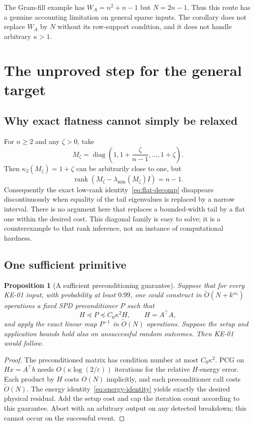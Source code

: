 \documentclass[11pt,a4paper]{article}
\newcommand{\rank}{\operatorname{rank}}
\newcommand{\diag}{\operatorname{diag}}
\newcommand{\softO}{\widetilde O}
\newcommand{\cond}{\kappa_2}
\newcommand{\eps}{\varepsilon}
\newtheorem{proposition}[theorem]{Proposition}
\theoremstyle{definition}
\theoremstyle{remark}
\begin{document}
The Gram-fill example has $W_A=n^2+n-1$ but $N=2n-1$. Thus this route has a genuine accounting limitation on general sparse inputs. The corollary does not replace $W_A$ by $N$ without its row-support condition, and it does not handle arbitrary $\kappa>1$.

\section{The unproved step for the general target}
\label{sec:missing}
\subsection{Why exact flatness cannot simply be relaxed}
For $n\ge2$ and any $\zeta>0$, take
\[
 M_\zeta=\diag\left(1,1+\frac\zeta{n-1},\ldots,1+\zeta\right).
\]
Then $\cond(M_\zeta)=1+\zeta$ can be arbitrarily close to one, but
\[
 \rank(M_\zeta-\lambda_{\min}(M_\zeta)I)=n-1.
\]
Consequently the exact low-rank identity~\eqref{eq:flat-decomp} disappears discontinuously when equality of the tail eigenvalues is replaced by a narrow interval. There is no argument here that replaces a bounded-width tail by a flat one within the desired cost. This diagonal family is easy to solve; it is a counterexample to that rank inference, not an instance of computational hardness.

\subsection{One sufficient primitive}
\begin{proposition}[A sufficient preconditioning guarantee]
\label{prop:sufficient}
Suppose that for every KE-01 input, with probability at least $0.99$, one could construct in $\softO(N+k^{\omega_0})$ operations a fixed SPD preconditioner $P$ such that
\begin{equation}
 H\preceq P\preceq C_0\kappa^2H,\qquad H=A^\top A, \label{eq:missing-primitive}
\end{equation}
and apply the exact linear map $P^{-1}$ in $\softO(N)$ operations. Suppose the setup and application bounds hold also on unsuccessful random outcomes. Then KE-01 would follow.
\end{proposition}
\begin{proof}
The preconditioned matrix has condition number at most $C_0\kappa^2$. PCG on $Hx=A^\top b$ needs $O(\kappa\log(2/\eps))$ iterations for the relative $H$-energy error. Each product by $H$ costs $O(N)$ implicitly, and each preconditioner call costs $\softO(N)$. The energy identity~\eqref{eq:energy-identity} yields exactly the desired physical residual. Add the setup cost and cap the iteration count according to this guarantee. Abort with an arbitrary output on any detected breakdown; this cannot occur on the successful event.
\end{proof}
\end{document}
